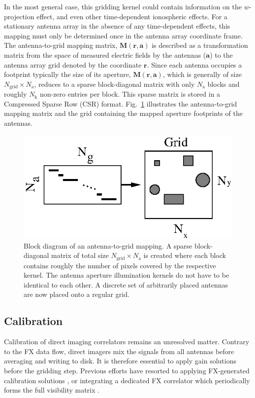 \documentclass[a4paper,fleqn,usenatbib]{../mnras}
\begin{document}
In the most general case, this gridding kernel could contain information on the
$w$-projection effect, and even other time-dependent ionospheric effects. For a
stationary antenna array in the absence of any time-dependent effects, this
mapping must only be determined once in the antenna array coordinate frame. The
antenna-to-grid mapping matrix, $\mathbf{M}(\mathbf{r},\mathbf{a})$ is described
as a transformation matrix from the space of measured electric fields by the 
antennas ($\mathbf{a}$) to the antenna array grid denoted by the coordinate 
$\mathbf{r}$. Since each antenna occupies a footprint typically the size of its 
aperture, $\mathbf{M}(\mathbf{r},\mathbf{a})$, which is generally of size
$N_\textrm{grid}\times N_\textrm{a}$, reduces to a sparse block-diagonal matrix
with only $N_\textrm{a}$ blocks and roughly $N_\textrm{k}$ non-zero entries per
block. This sparse matrix is stored in a Compressed Sparse Row (CSR) format. 
Fig.~\ref{fig:a2g-mapping} illustrates the antenna-to-grid mapping
matrix and the grid containing the mapped aperture footprints of the antennas.

\begin{figure}
  \includegraphics[width=\columnwidth]{a2g_mapping.eps}
  \caption{Block diagram of an antenna-to-grid mapping. A sparse block-diagonal
    matrix of total size $N_\textrm{grid}\times N_\textrm{a}$ is created where each
    block contains roughly the number of pixels covered by the respective kernel.
    The antenna aperture illumination kernels do not have to be identical to each
    other. A discrete set of arbitrarily placed antennas are now placed onto a
    regular grid.}
  \label{fig:a2g-mapping}
\end{figure}

\subsection{Calibration}
Calibration of direct imaging correlators remains an unresolved matter. Contrary
to the FX data flow, direct imagers mix the signals from all antennas before
averaging and writing to disk. It is therefore essential to apply gain solutions 
before the gridding step. Previous efforts have resorted to applying FX-generated
calibration solutions \citep{zhe14, fos14}, or integrating a dedicated FX correlator 
which periodically forms the full visibility matrix \citep{wij09, dev09}. 
\end{document}
